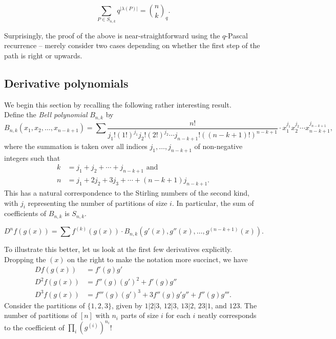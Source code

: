 	\begin{ftheo}
		\[ \sum_{P \in S_{n,k}} q^{|\lambda(P)|} = \binom{n}{k}_q. \]
	\end{ftheo}
	Surprisingly, the proof of the above is near-straightforward using the $q$-Pascal recurrence -- merely consider two cases depending on whether the first step of the path is right or upwards.

\subsection{Derivative polynomials}

	We begin this section by recalling the following rather interesting result.\\
	Define the \emph{Bell polynomial} $B_{n,k}$ by
	\[ B_{n,k}(x_1,x_2,\ldots,x_{n-k+1}) = \sum \frac{n!}{j_1! (1!)^{j_1} j_2! (2!)^{j_2} \cdots j_{n-k+1}! ((n-k+1)!)^{n-k+1}} \cdot x_1^{j_1} x_2^{j_2} \cdots x_{n-k+1}^{j_{n-k+1}}, \]
	where the summation is taken over all indices $j_1,\ldots,j_{n-k+1}$ of non-negative integers such that
	\begin{align*}
		k &= j_1 + j_2 + \cdots + j_{n-k+1} \text{ and} \\
		n &= j_1 + 2j_2 + 3j_3 + \cdots + (n-k+1)j_{n-k+1}.
	\end{align*}
	This has a natural correspondence to the Stirling numbers of the second kind, with $j_i$ representing the number of partitions of size $i$. In particular, the sum of coefficients of $B_{n,k}$ is $S_{n,k}$.

	\begin{fprop}
		\[ D^n f(g(x)) = \sum f^{(k)}(g(x)) \cdot B_{n,k} (g'(x), g''(x), \ldots, g^{(n-k+1)}(x)). \]
	\end{fprop}

	To illustrate this better, let us look at the first few derivatives explicitly. Dropping the $(x)$ on the right to make the notation more succinct, we have
	\begin{align*}
		Df(g(x)) &= f'(g) g' \\
		D^2f(g(x)) &= f''(g) (g')^2 + f'(g) g'' \\
		D^3f(g(x)) &= f'''(g) (g')^3 + 3 f''(g) g' g'' + f''(g) g'''.
	\end{align*}
	Consider the partitions of $\{1,2,3\}$, given by $1|2|3$, $12|3$, $13|2$, $23|1$, and $123$. The number of partitions of $[n]$ with $n_i$ parts of size $i$ for each $i$ neatly corresponds to the coefficient of $\prod_i (g^{(i)})^{n_i}$!

